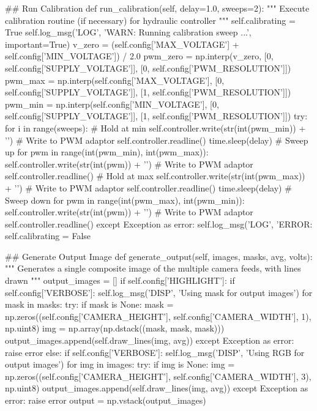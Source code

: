 \begin{python}
    ## Run Calibration
    def run_calibration(self, delay=1.0, sweeps=2):
        """
        Execute calibration routine (if necessary) for hydraulic controller
        """
        self.calibrating = True
        self.log_msg('LOG', 'WARN: Running calibration sweep ...', important=True)
        v_zero = (self.config['MAX_VOLTAGE'] + self.config['MIN_VOLTAGE']) / 2.0
        pwm_zero = np.interp(v_zero, [0, self.config['SUPPLY_VOLTAGE']], [0, self.config['PWM_RESOLUTION']])
        pwm_max = np.interp(self.config['MAX_VOLTAGE'], [0, self.config['SUPPLY_VOLTAGE']], [1, self.config['PWM_RESOLUTION']])
        pwm_min = np.interp(self.config['MIN_VOLTAGE'], [0, self.config['SUPPLY_VOLTAGE']], [1, self.config['PWM_RESOLUTION']])
        try: 
            for i in range(sweeps):
                # Hold at min
                self.controller.write(str(int(pwm_min)) + '\n') # Write to PWM adaptor
                self.controller.readline()
                time.sleep(delay)
                # Sweep up     
                for pwm in range(int(pwm_min), int(pwm_max)):
                    self.controller.write(str(int(pwm)) + '\n') # Write to PWM adaptor
                    self.controller.readline()
                # Hold at max
                self.controller.write(str(int(pwm_max)) + '\n') # Write to PWM adaptor
                self.controller.readline()
                time.sleep(delay)
                # Sweep down            
                for pwm in range(int(pwm_max), int(pwm_min)):
                    self.controller.write(str(int(pwm)) + '\n') # Write to PWM adaptor
                    self.controller.readline()
        except Exception as error:
            self.log_msg('LOG', 'ERROR: %
        self.calibrating = False

    ## Generate Output Image
    def generate_output(self, images, masks, avg, volts):
        """
        Generates a single composite image of the multiple camera feeds, with lines drawn
        """
        output_images = []
        if self.config['HIGHLIGHT']:
            if self.config['VERBOSE']: self.log_msg('DISP', 'Using mask for output images')
            for mask in masks:
                try:
                    if mask is None: mask = np.zeros((self.config['CAMERA_HEIGHT'], self.config['CAMERA_WIDTH'], 1), np.uint8)
                    img = np.array(np.dstack((mask, mask, mask)))
                    output_images.append(self.draw_lines(img, avg))
                except Exception as error:
                    raise error
        else:
            if self.config['VERBOSE']: self.log_msg('DISP', 'Using RGB for output images')
            for img in images:
                try:
                    if img is None: img = np.zeros((self.config['CAMERA_HEIGHT'], self.config['CAMERA_WIDTH'], 3), np.uint8)
                    output_images.append(self.draw_lines(img, avg))
                except Exception as error:
                    raise error
        output = np.vstack(output_images)


\end{python}

